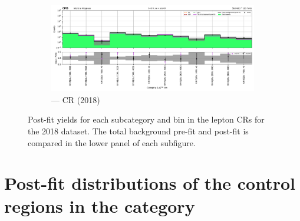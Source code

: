 \begin{figure}[htbp]
    \begin{subfigure}[b]{0.66\textwidth}
        \includegraphics[width=\textwidth]{chapters/higgstoinv/figures/mountain_ranges/2018/ttH/Zee_tree_fit_s-abs_values_ttH_cats.pdf}
        \caption{\ttH --- \doubleEleCr \gls{CR} (2018)}
    \end{subfigure}
    \caption[Post-fit yields for each \ttH subcategory and \ptmiss bin in the lepton control regions for the 2018 dataset]{Post-fit yields for each \ttH subcategory and \ptmiss bin in the lepton \glspl{CR} for the 2018 dataset. The total background pre-fit and post-fit is compared in the lower panel of each subfigure.}
    \label{fig:htoinv_mountain_range_ttH_2018_CRs}
\end{figure}





\section{Post-fit distributions of the control regions in the \texorpdfstring{\VH}{VH} category}
\label{sec:pre_post_fit_plots_VH_CRs}

